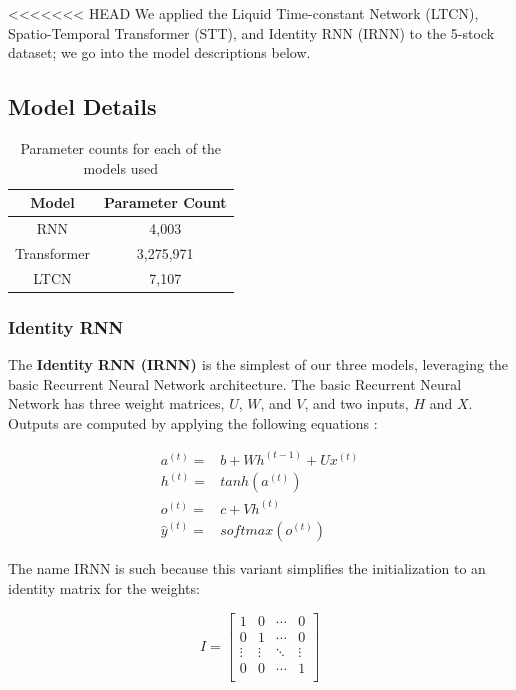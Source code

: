 \documentclass[10pt,twocolumn,letterpaper]{article}
\begin{document}
<<<<<<< HEAD
We applied the  Liquid Time-constant Network (LTCN), Spatio-Temporal Transformer (STT), and Identity RNN (IRNN) to the 5-stock dataset; we go into the model descriptions below.

    \subsection{Model Details}

\begin{table}
\begin{center}
    \begin{tabular}{|c|c|}
\hline
        Model & Parameter Count \\
\hline
        RNN & 4,003 \\
\hline
        Transformer & 3,275,971 \\
\hline
        LTCN & 7,107 \\
\hline
\end{tabular}
\end{center}
    \caption{Parameter counts for each of the models used}
\label{tab:parametercounts}
\end{table}

    \subsubsection{Identity RNN}

    The \textbf{Identity RNN (IRNN) \cite{irnn_initialize}} is the simplest of our three models, leveraging the basic Recurrent Neural Network architecture. The basic Recurrent Neural Network has three weight matrices, $U$, $W$, and $V$, and two inputs, $H$ and $X$. Outputs are computed by applying the following equations \cite{deep_learning_book}:

    \begin{align}
        a^{(t)} =& b + W h^{(t-1)} + U x^{(t)} \\
        h^{(t)} =& tanh(a^{(t)}) \\
        o^{(t)} =& c + V h^{(t)} \\
        \hat{y}^{(t)} =& softmax(o^{(t)})
    \end{align}

    The name IRNN is such because this variant simplifies the initialization to an identity matrix for the weights: 

    \begin{equation}
        \renewcommand\arraystretch{2}
        I = \begin{bmatrix}
            1 & 0 & \cdots & 0 \\
            0 & 1 & \cdots & 0 \\
            \vdots & \vdots & \ddots & \vdots \\
            0 & 0 & \cdots & 1 \\
        \end{bmatrix}
    \end{equation}
\end{document}
